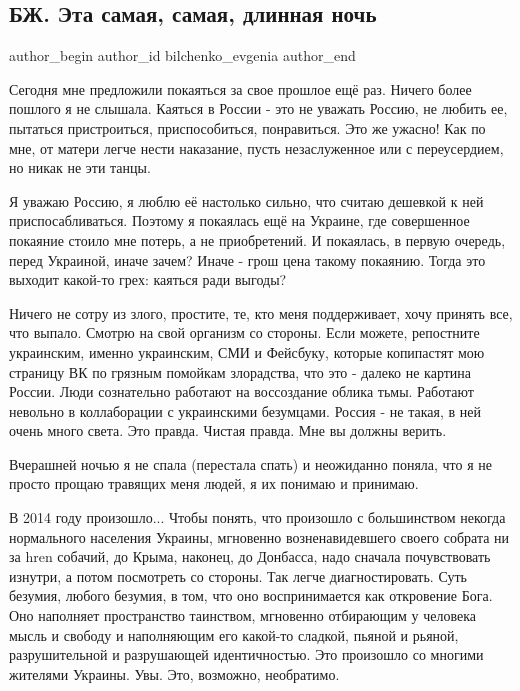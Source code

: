  
 
 
 
 
\subsection{БЖ. Эта самая, самая, длинная ночь}
\label{sec:22_12_2021.tg.bilchenko_evgenia.1.dlinnaja_noch}

\ifcmt
 author_begin
   author_id bilchenko_evgenia
 author_end
\fi

Сегодня мне предложили покаяться за свое прошлое ещё раз. Ничего более пошлого
я не слышала. Каяться в России - это не уважать Россию, не любить ее, пытаться
пристроиться, приспособиться, понравиться. Это же ужасно! Как по мне, от матери
легче нести наказание, пусть незаслуженное или с переусердием, но никак не эти
танцы. 

Я уважаю Россию, я люблю её настолько сильно, что считаю дешевкой к ней
приспосабливаться. Поэтому я покаялась ещё на Украине, где совершенное покаяние
стоило мне потерь, а не приобретений. И покаялась, в первую очередь, перед
Украиной, иначе зачем? Иначе - грош цена такому покаянию. Тогда это выходит
какой-то грех: каяться ради выгоды?


Ничего не сотру из злого, простите, те, кто меня поддерживает, хочу принять
все, что выпало. Смотрю на свой организм со стороны. Если можете, репостните
украинским, именно украинским, СМИ и Фейсбуку, которые копипастят мою страницу
ВК по грязным помойкам злорадства, что это - далеко не картина России. Люди
сознательно работают на воссоздание облика тьмы. Работают невольно в
коллаборации с украинскими безумцами. Россия - не такая, в ней очень много
света. Это правда. Чистая правда. Мне вы должны верить.

Вчерашней ночью я не спала (перестала спать) и неожиданно поняла, что я не
просто прощаю травящих меня людей, я их понимаю и принимаю.

В 2014 году произошло... Чтобы понять, что произошло с большинством некогда
нормального населения Украины, мгновенно возненавидевшего своего собрата ни за
hren собачий, до Крыма, наконец, до Донбасса, надо сначала почувствовать
изнутри, а потом посмотреть со стороны. Так легче диагностировать. Суть
безумия, любого безумия, в том, что оно воспринимается как откровение Бога. Оно
наполняет пространство таинством, мгновенно отбирающим у человека мысль и
свободу и наполняющим его какой-то сладкой, пьяной и рьяной, разрушительной и
разрушающей идентичностью. Это произошло со многими жителями Украины. Увы. Это,
возможно, необратимо.

